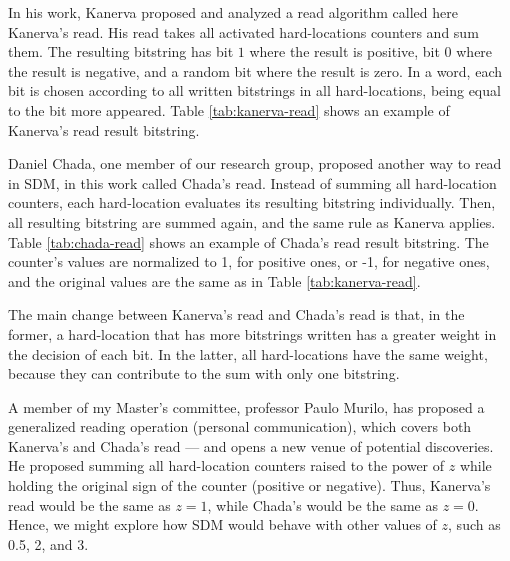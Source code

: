 In his work, Kanerva proposed and analyzed a read algorithm called here Kanerva's read. His read takes all activated hard-locations counters and sum them. The resulting bitstring has bit $1$ where the result is positive, bit $0$ where the result is negative, and a random bit where the result is zero. In a word, each bit is chosen according to all written bitstrings in all hard-locations, being equal to the bit more appeared. Table \ref{tab:kanerva-read} shows an example of Kanerva's read result bitstring.

Daniel Chada, one member of our research group, proposed another way to read in SDM, in this work called Chada's read. Instead of summing all hard-location counters, each hard-location evaluates its resulting bitstring individually. Then, all resulting bitstring are summed again, and the same rule as Kanerva applies. Table \ref{tab:chada-read} shows an example of Chada's read result bitstring. The counter's values are normalized to 1, for positive ones, or -1, for negative ones, and the original values are the same as in Table \ref{tab:kanerva-read}.

The main change between Kanerva's read and Chada's read is that, in the former, a hard-location that has more bitstrings written has a greater weight in the decision of each bit. In the latter, all hard-locations have the same weight, because they can contribute to the sum with only one bitstring.

A member of my Master's committee, professor Paulo Murilo, has proposed a generalized reading operation (personal communication), which covers both Kanerva's and Chada's read --- and opens a new venue of potential discoveries. He proposed summing all hard-location counters raised to the power of $z$ while holding the original sign of the counter (positive or negative). Thus, Kanerva's read would be the same as $z=1$, while Chada's would be the same as $z=0$. Hence, we might explore how SDM would behave with other values of $z$, such as 0.5, 2, and 3.

